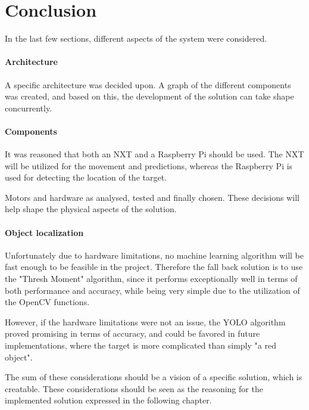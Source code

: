 \section{Conclusion}
In the last few sections, different aspects of the system were considered.

\paragraph{Architecture}
A specific architecture was decided upon.
A graph of the different components was created, and based on this, the development of the solution can take shape concurrently.


\paragraph{Components}
It was reasoned that both an NXT and a Raspberry Pi should be used.
The NXT will be utilized for the movement and predictions, whereas the Raspberry Pi is used for detecting the location of the target.


Motors and hardware as analysed, tested and finally chosen.
These decisions will help shape the physical aspects of the solution.


\paragraph{Object localization}
Unfortunately due to hardware limitations, no machine learning algorithm will be fast enough to be feasible in the project.
Therefore the fall back solution is to use the "Thresh Moment" algorithm, since it performs exceptionally well in terms of both performance and accuracy, while being very simple due to the utilization of the OpenCV functions.

However, if the hardware limitations were not an issue, the YOLO algorithm proved promising in terms of accuracy, and could be favored in future implementations, where the target is more complicated than simply "a red object".

The sum of these considerations should be a vision of a specific solution, which is creatable.
These considerations should be seen as the reasoning for the implemented solution expressed in the following chapter.
